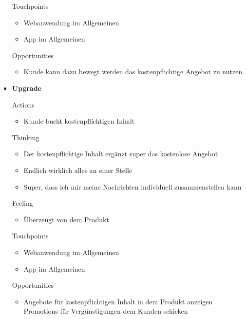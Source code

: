 \begin{itemize}
  Touchpoints

  \begin{itemize}
    \item Webanwendung im Allgemeinen
    \item App im Allgemeinen
  \end{itemize}

  Opportunities

  \begin{itemize}
    \item Kunde kann dazu bewegt werden das kostenpflichtige Angebot zu nutzen
  \end{itemize}

  \item \textbf{Upgrade}

  Actions

  \begin{itemize}
    \item Kunde bucht kostenpflichtigen Inhalt
  \end{itemize}

  Thinking

  \begin{itemize}
    \item Der kostenpflichtige Inhalt ergänzt super das kostenlose Angebot
    \item Endlich wirklich alles an einer Stelle
    \item Super, dass ich mir meine Nachrichten individuell zusammenstellen kann
  \end{itemize}

  Feeling

  \begin{itemize}
    \item Überzeugt von dem Produkt
  \end{itemize}

  Touchpoints

  \begin{itemize}
    \item Webanwendung im Allgemeinen
    \item App im Allgemeinen
  \end{itemize}

  Opportunities

  \begin{itemize}
    \item Angebote für kostenpflichtigen Inhalt in dem Produkt anzeigen
Promotions für Vergünstigungen dem Kunden schicken
  \end{itemize}

\end{itemize}


